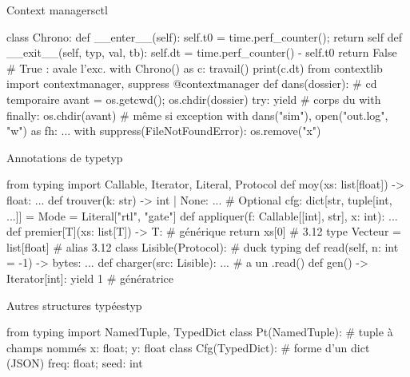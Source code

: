 \documentclass{article}
\begin{document}
\newpage
{}
\noindent
\begin{colonne}
\begin{bloc}{Context managers}{ctl}
\begin{code}
class Chrono:
    def __enter__(self):
        self.t0 = time.perf_counter(); return self
    def __exit__(self, typ, val, tb):
        self.dt = time.perf_counter() - self.t0
        return False     # True : avale l'exc.
with Chrono() as c: travail()
print(c.dt)
from contextlib import contextmanager, suppress
@contextmanager
def dans(dossier):       # cd temporaire
    avant = os.getcwd(); os.chdir(dossier)
    try:
        yield            # corps du with
    finally:
        os.chdir(avant)  # même si exception
with dans("sim"), open("out.log", "w") as fh: ...
with suppress(FileNotFoundError): os.remove("x")
\end{code}
\end{bloc}

\begin{bloc}{Annotations de type}{typ}
\begin{code}
from typing import Callable, Iterator, Literal, Protocol
def moy(xs: list[float]) -> float: ...
def trouver(k: str) -> int | None: ...  # Optional
cfg: dict[str, tuple[int, ...]] = {}
Mode = Literal["rtl", "gate"]
def appliquer(f: Callable[[int], str], x: int): ...
def premier[T](xs: list[T]) -> T:       # générique
    return xs[0]                        # 3.12
type Vecteur = list[float]              # alias 3.12
class Lisible(Protocol):                # duck typing
    def read(self, n: int = -1) -> bytes: ...
def charger(src: Lisible): ...          # a un .read()
def gen() -> Iterator[int]: yield 1     # génératrice
\end{code}
\end{bloc}

\begin{bloc}{Autres structures typées}{typ}
\begin{code}
from typing import NamedTuple, TypedDict
class Pt(NamedTuple):  # tuple à champs nommés
    x: float; y: float
class Cfg(TypedDict):  # forme d'un dict (JSON)
    freq: float; seed: int
\end{code}
\end{bloc}


\end{colonne}
\end{document}
